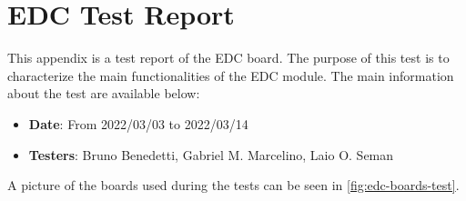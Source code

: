 %
%
%
%
%

%
%
%
%
%

\chapter{EDC Test Report} \label{anx:edc-report}

This appendix is a test report of the EDC board. The purpose of this test is to characterize the main functionalities of the EDC module. The main information about the test are available below:

\begin{itemize}
    \item \textbf{Date}: From 2022/03/03 to 2022/03/14
    \item \textbf{Testers}: Bruno Benedetti, Gabriel M. Marcelino, Laio O. Seman
\end{itemize}

A picture of the boards used during the tests can be seen in \autoref{fig:edc-boards-test}.

